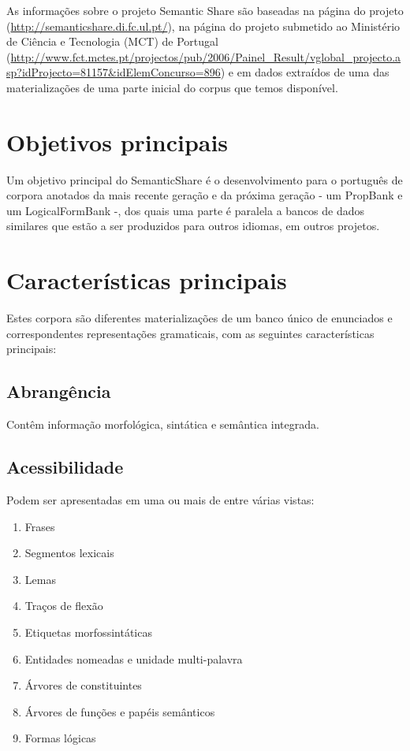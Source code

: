 As informações sobre o projeto Semantic Share são baseadas na página do projeto (\url{http://semanticshare.di.fc.ul.pt/}), na página do projeto submetido ao Ministério de Ciência e Tecnologia (MCT) de Portugal (\url{http://www.fct.mctes.pt/projectos/pub/2006/Painel_Result/vglobal_projecto.asp?idProjecto=81157&idElemConcurso=896}) e em dados extraídos de uma das materializações de uma parte inicial do corpus que temos disponível.

\section{Objetivos principais} %
\label{sec:semantic_objetivos}

Um objetivo principal do SemanticShare é o desenvolvimento para o português de corpora anotados da mais recente geração e da próxima geração - um PropBank e um LogicalFormBank -, dos quais uma parte é paralela a bancos de dados similares que estão a ser produzidos para outros idiomas, em outros projetos.

\section{Características principais} %
\label{sec:semantic_catacteristicas}


Estes corpora são diferentes materializações de um banco único de enunciados e correspondentes representações gramaticais, com as seguintes características principais:


\subsection{Abrangência} %
\label{sub:semantic_abrangencia}

Contêm informação morfológica, sintática e semântica integrada.


\subsection{Acessibilidade} %
\label{sub:semantic_acessibilidade}

Podem ser apresentadas em uma ou mais de entre várias vistas:

\begin{enumerate}
  \item Frases
  \item Segmentos lexicais
  \item Lemas
  \item Traços de flexão
  \item Etiquetas morfossintáticas
  \item Entidades nomeadas e unidade multi-palavra
  \item Árvores de constituintes
  \item Árvores de funções e papéis semânticos
  \item Formas lógicas
\end{enumerate}




